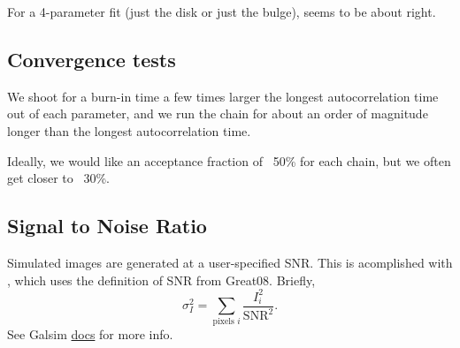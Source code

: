 \documentclass{article}
\begin{document}
For a 4-parameter fit (just the disk or just the bulge),  seems to be about right.

\subsection{Convergence tests}
We shoot for a burn-in time a few times larger the longest
autocorrelation time out of each parameter, and we run the chain for
about an order of magnitude longer than the longest autocorrelation
time.

Ideally, we would like an acceptance fraction of ~50\% for each chain, but
we often get closer to ~30\%.

\subsection{Signal to Noise Ratio}
Simulated images are generated at a user-specified SNR.  This is
acomplished with , which uses the
definition of SNR from Great08.  Briefly,
\[
\sigma_I^2 = \sum_{\textrm{pixels } i}\frac{I_i^2}{\textrm{SNR}^2}.
\]
See Galsim
\href{http://galsim-developers.github.io/GalSim/namespacegalsim_1_1noise.html#a86f91278331ac9c134c25b16d4c67a32}{docs}
for more info.
\end{document}

